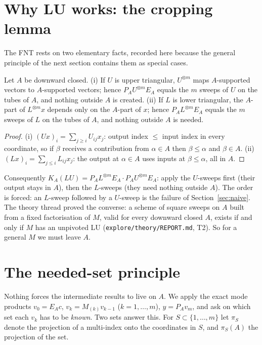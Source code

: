 \documentclass[11pt]{article}
\newcommand{\PA}{P_{\!A}}\newcommand{\EA}{E_{A}}\newcommand{\KA}{K_{\!A}}
\newcommand{\pr}[1]{\pi_{#1}}
\begin{document}
\section{Why LU works: the cropping lemma}
The FNT rests on two elementary facts, recorded here because the general principle of the next section
contains them as special cases.
\begin{lemma}\label{lem:crop}
Let $A$ be downward closed.
(i) If $U$ is upper triangular, $U^{\otimes m}$ maps $A$-supported vectors to $A$-supported vectors; hence
$\PA U^{\otimes m}\EA$ equals the $m$ sweeps of $U$ on the tubes of $A$, and nothing outside $A$ is created.
(ii) If $L$ is lower triangular, the $A$-part of $L^{\otimes m}x$ depends only on the $A$-part of $x$; hence
$\PA L^{\otimes m}\EA$ equals the $m$ sweeps of $L$ on the tubes of $A$, and nothing outside $A$ is needed.
\end{lemma}
\begin{proof}
(i) $(Ux)_i=\sum_{j\ge i}U_{ij}x_j$: output index $\le$ input index in every coordinate, so if $\beta$ receives a
contribution from $\alpha\in A$ then $\beta\le\alpha$ and $\beta\in A$. (ii) $(Lx)_i=\sum_{j\le i}L_{ij}x_j$: the output at
$\alpha\in A$ uses inputs at $\beta\le\alpha$, all in $A$.
\end{proof}
Consequently $\KA(LU)=\PA L^{\otimes m}\EA\cdot\PA U^{\otimes m}\EA$: apply the $U$-sweeps first (their output stays in $A$),
then the $L$-sweeps (they need nothing outside $A$). The order is forced: an $L$-sweep followed by a $U$-sweep is
the failure of Section~\ref{sec:naive}. The theory thread proved the converse: a scheme of square sweeps on $A$
built from a fixed factorisation of $M$, valid for every downward closed $A$, exists if and only if $M$ has an
unpivoted LU (\texttt{explore/theory/REPORT.md}, T2). So for a general $M$ we must leave $A$.

\section{The needed-set principle}\label{sec:needed}
Nothing forces the intermediate results to live on $A$. We apply the exact mode products
$v_0=\EA c$, $v_k=M_{(k)}v_{k-1}$ ($k=1,\dots,m$), $y=\PA v_m$, and ask on which set each $v_k$ has to be
\emph{known}. Two sets answer this. For $S\subset\{1,\dots,m\}$ let $\pr{S}$ denote the projection of a multi-index
onto the coordinates in $S$, and $\pr{S}(A)$ the projection of the set.
\end{document}
